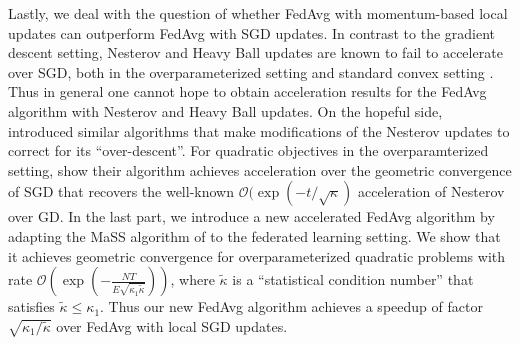 Lastly, we deal with the question of whether FedAvg with momentum-based
local updates can outperform FedAvg with SGD updates. In contrast
to the gradient descent setting, Nesterov and Heavy Ball updates are
known to fail to accelerate over SGD, both in the overparameterized
setting and standard convex setting \cite{liu2018accelerating,kidambi2018insufficiency,liu2018toward,yuan2016influence}.
Thus in general one cannot hope to obtain acceleration results for
the FedAvg algorithm with Nesterov and Heavy Ball updates. On the
hopeful side, \cite{jain2017accelerating,liu2018accelerating} introduced
similar algorithms that make modifications of the Nesterov updates
to correct for its ``over-descent''. For quadratic objectives in
the overparamterized setting, \cite{liu2018accelerating} show their
algorithm achieves acceleration over the geometric convergence of
SGD that recovers the well-known $\mathcal{O}(\exp(-t/\sqrt{\kappa})$
acceleration of Nesterov over GD. In the last part, we introduce a
new accelerated FedAvg algorithm by adapting the MaSS algorithm of
\cite{liu2018accelerating} to the federated learning setting. We
show that it achieves geometric convergence for overparameterized
quadratic problems with rate $\mathcal{O}(\exp(-\frac{NT}{E\sqrt{\kappa_{1}\tilde{\kappa}}}))$,
where $\tilde{\kappa}$ is a ``statistical condition number''\cite{liu2018accelerating,jain2017accelerating}
that satisfies $\tilde{\kappa}\leq\kappa_{1}$. Thus our new FedAvg
algorithm achieves a speedup of factor $\sqrt{\kappa_{1}/\tilde{\kappa}}$
over FedAvg with local SGD updates. 

